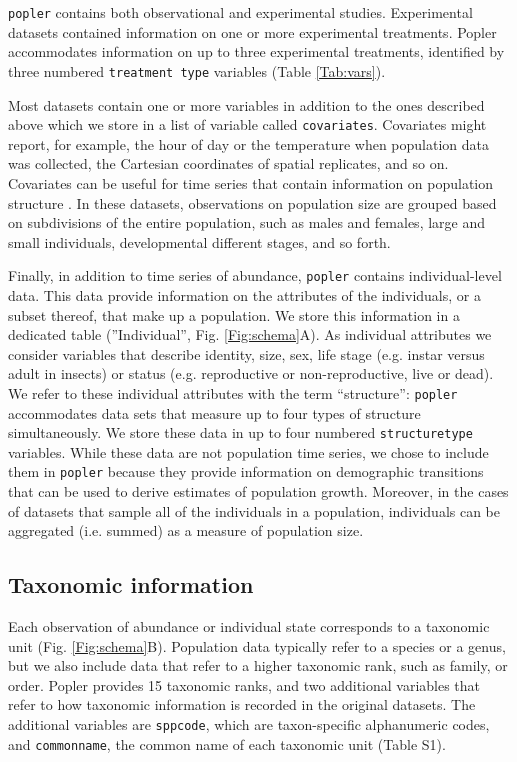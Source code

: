 \documentclass{article}\usepackage[]{graphicx}\usepackage[]{color}
\newcommand{\tom}[1]{{\textit{\color{red}{[#1]}}}}
\begin{document}
\texttt{popler} contains both observational and experimental studies. Experimental datasets contained information on one or more experimental treatments. Popler accommodates information on up to three experimental treatments, identified by three numbered \texttt{treatment type} variables (Table \ref{Tab:vars}). 

Most datasets contain one or more variables in addition to the ones described above which we store in a list of variable called \texttt{covariates}. Covariates might report, for example, the hour of day or the temperature when population data was collected, the Cartesian coordinates of spatial replicates, and so on. Covariates can be useful for time series that contain information on population structure \tom{Would this be indicated in the metadata? How would someone search for such studies or know if they are working with one?}. In these datasets, observations on population size are grouped based on subdivisions of the entire population, such as males and females, large and small individuals, developmental different stages, and so forth.

Finally, in addition to time series of abundance, \texttt{popler} contains individual-level data. This data provide information on the attributes of the individuals, or a subset thereof, that make up a population. We store this information in a dedicated table (''Individual'', Fig. \ref{Fig:schema}A). As individual attributes we consider variables that describe identity, size, sex, life stage (e.g. instar versus adult in insects) or status (e.g. reproductive or non-reproductive, live or dead). We refer to these individual attributes with the term ``structure'': \texttt{popler} accommodates data sets that measure up to four types of structure simultaneously. We store these data in up to four numbered \texttt{structure\textunderscore type} variables. While these data are not population time series, we chose to include them in \texttt{popler} because they provide information on demographic transitions that can be used to derive estimates of population growth. Moreover, in the cases of datasets that sample all of the individuals in a population, individuals can be aggregated (i.e. summed) as a measure of population size.

\subsection*{Taxonomic information}
Each observation of abundance or individual state corresponds to a taxonomic unit (Fig. \ref{Fig:schema}B). Population data typically refer to a species or a genus, but we also include data that refer to a higher taxonomic rank, such as family, or order. %
Popler provides 15 taxonomic ranks, and two additional variables that refer to how taxonomic information is recorded in the original datasets. The additional variables are \texttt{sppcode}, which are taxon-specific alphanumeric codes, and \texttt{common\textunderscore name}, the common name of each taxonomic unit (Table S1).
\end{document}
